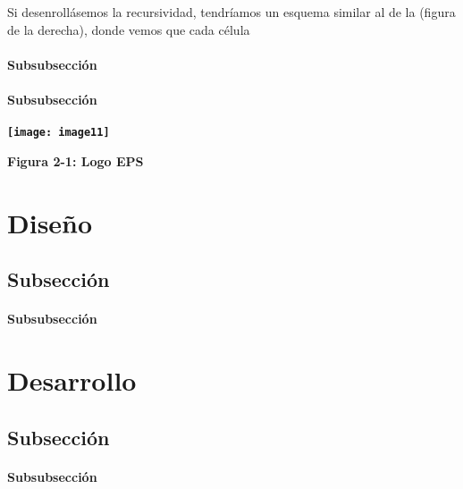 \documentclass{article} %
\begin{document}
\noindent 

\noindent Si desenroll\'{a}semos la recursividad, tendr\'{i}amos un esquema similar al de la (figura de la derecha), donde vemos que cada c\'{e}lula 

\noindent 


\paragraph{ Subsubsecci\'{o}n}

\noindent 


\paragraph{ Subsubsecci\'{o}n}

\noindent 

\noindent 

\noindent 

\noindent \textbf{\texttt{[image: image11]}}

\noindent \textbf{Figura 2-1: Logo EPS}

\noindent 

\noindent 


\section{ Dise\~{n}o}


\subsection{ Subsecci\'{o}n}


\paragraph{ Subsubsecci\'{o}n}

\noindent 




\section{ Desarrollo}


\subsection{ Subsecci\'{o}n}


\paragraph{ Subsubsecci\'{o}n}
\end{document}

